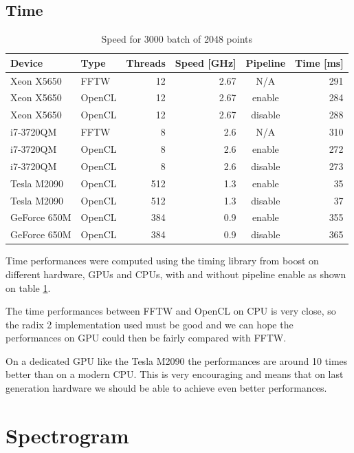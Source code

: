    \subsection{Time}

	\begin{table}[H]
		\caption{Speed for 3000 batch of 2048 points}
		\centering
		\label{tab:speed}
		\begin{tabular}{|l|lrrcr|}
			\hline
				Device & Type & Threads & Speed [GHz] & Pipeline & Time [ms] \\
			\hline
			\hline
				Xeon X5650 & FFTW & 12 & 2.67 & N/A & 291 \\
				Xeon X5650 & OpenCL & 12 & 2.67 & enable & 284 \\
				Xeon X5650 & OpenCL & 12 & 2.67 & disable & 288 \\
			\hline
				i7-3720QM & FFTW & 8 & 2.6 & N/A & 310 \\
				i7-3720QM & OpenCL & 8 & 2.6 & enable & 272 \\
				i7-3720QM & OpenCL & 8 & 2.6 & disable & 273 \\
			\hline
			\hline
				Tesla M2090 & OpenCL & 512 & 1.3 & enable & 35 \\
				Tesla M2090 & OpenCL & 512 & 1.3 & disable & 37 \\
			\hline
				GeForce 650M & OpenCL & 384 & 0.9 & enable & 355 \\
				GeForce 650M & OpenCL & 384 & 0.9 & disable & 365 \\
			\hline
		\end{tabular}
	\end{table}

	Time performances were computed using the timing library from boost \cite{boost} on different hardware, \glspl{GPU} and \glspl{CPU}, with and without pipeline enable as shown on table \ref{tab:speed}.

	The time performances between \gls{FFTW} and \gls{OpenCL} on \gls{CPU} is very close, so the radix 2 implementation used must be good and we can hope the performances on \gls{GPU} could then be fairly compared with \gls{FFTW}.

	On a dedicated \gls{GPU} like the Tesla M2090  the performances are around 10 times better than on a modern \gls{CPU}. This is very encouraging and means that on last generation hardware we should be able to achieve even better performances.
	
\section{Spectrogram}
\label{sec:spectrogram}

